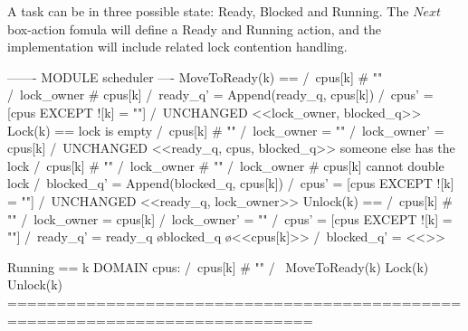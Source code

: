 A task can be in three possible state: Ready, Blocked and Running. The $Next$
box-action fomula will define a Ready and Running action, and the implementation
will include related lock contention handling.\newline

\begin{tla}
------- MODULE scheduler ---- 
MoveToReady(k) == 
    /\ cpus[k] # "" 
    /\ lock_owner # cpus[k]
    /\ ready_q' = Append(ready_q, cpus[k]) 
    /\ cpus' = [cpus EXCEPT ![k] = ""]
    /\ UNCHANGED <<lock_owner, blocked_q>>
Lock(k) == 
    \* lock is empty
    \/  /\ cpus[k] # "" 
        /\ lock_owner = ""
        /\ lock_owner' = cpus[k]
        /\ UNCHANGED <<ready_q, cpus, blocked_q>>
    \* someone else has the lock
    \/  /\ cpus[k] # "" 
        /\ lock_owner # ""
        /\ lock_owner # cpus[k] \* cannot double lock
        /\ blocked_q' = Append(blocked_q, cpus[k])
        /\ cpus' = [cpus EXCEPT ![k] = ""]
        /\ UNCHANGED <<ready_q, lock_owner>>
Unlock(k) == 
    /\ cpus[k] # "" 
    /\ lock_owner = cpus[k]
    /\ lock_owner' = ""
    /\ cpus' = [cpus EXCEPT ![k] = ""]
    /\ ready_q' = ready_q \o blocked_q \o <<cpus[k]>>
    /\ blocked_q' = <<>>

Running == 
    \E k \in DOMAIN cpus:
        /\ cpus[k] # "" 
        /\ \/ MoveToReady(k)
           \/ Lock(k)
           \/ Unlock(k)
=============================================================================
\end{tla}
